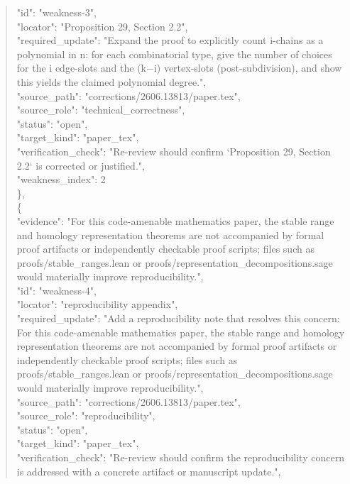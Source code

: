 \documentclass[11pt]{article}
\begin{document}
\begin{quote}
      "id": "weakness-3",\\
      "locator": "Proposition 29, Section 2.2",\\
      "required\_update": "Expand the proof to explicitly count i-chains as a polynomial in n: for each combinatorial type, give the number of choices for the i edge-slots and the (k\ensuremath{-}i) vertex-slots (post-subdivision), and show this yields the claimed polynomial degree.",\\
      "source\_path": "corrections/2606.13813/paper.tex",\\
      "source\_role": "technical\_correctness",\\
      "status": "open",\\
      "target\_kind": "paper\_tex",\\
      "verification\_check": "Re-review should confirm `Proposition 29, Section 2.2` is corrected or justified.",\\
      "weakness\_index": 2\\
    \},\\
    \{\\
      "evidence": "For this code-amenable mathematics paper, the stable range and homology representation theorems are not accompanied by formal proof artifacts or independently checkable proof scripts; files such as proofs/stable\_ranges.lean or proofs/representation\_decompositions.sage would materially improve reproducibility.",\\
      "id": "weakness-4",\\
      "locator": "reproducibility appendix",\\
      "required\_update": "Add a reproducibility note that resolves this concern: For this code-amenable mathematics paper, the stable range and homology representation theorems are not accompanied by formal proof artifacts or independently checkable proof scripts; files such as proofs/stable\_ranges.lean or proofs/representation\_decompositions.sage would materially improve reproducibility.",\\
      "source\_path": "corrections/2606.13813/paper.tex",\\
      "source\_role": "reproducibility",\\
      "status": "open",\\
      "target\_kind": "paper\_tex",\\
      "verification\_check": "Re-review should confirm the reproducibility concern is addressed with a concrete artifact or manuscript update.",\\

\end{quote}
\end{document}
